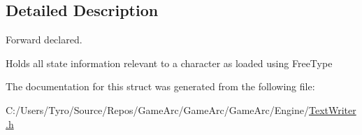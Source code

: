 \subsection{Detailed Description}
Forward declared. 

Holds all state information relevant to a character as loaded using Free\+Type 

The documentation for this struct was generated from the following file\+:\begin{DoxyCompactItemize}
\item 
C\+:/\+Users/\+Tyro/\+Source/\+Repos/\+Game\+Arc/\+Game\+Arc/\+Game\+Arc/\+Engine/\mbox{\hyperlink{_text_writer_8h}{Text\+Writer.\+h}}\end{DoxyCompactItemize}
